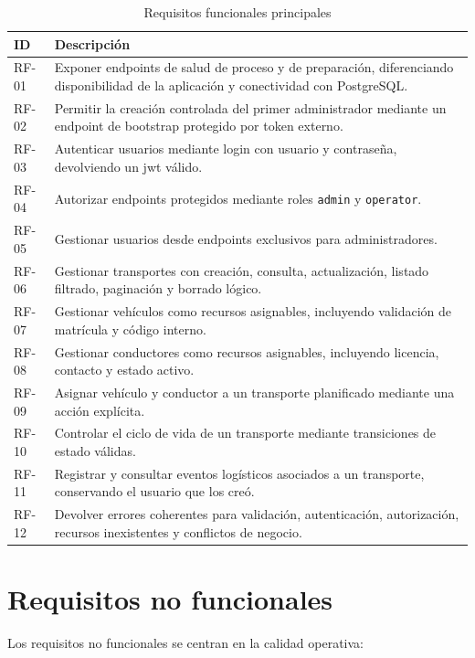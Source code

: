\begin{longtable}{@{}p{}p{}@{}}
\caption{Requisitos funcionales principales}
\label{tab:requisitos-funcionales}\\
\textbf{ID} & \textbf{Descripción} \\
\hline
RF-01 & Exponer endpoints de salud de proceso y de preparación, diferenciando disponibilidad de la aplicación y conectividad con PostgreSQL. \\
RF-02 & Permitir la creación controlada del primer administrador mediante un endpoint de bootstrap protegido por token externo. \\
RF-03 & Autenticar usuarios mediante login con usuario y contraseña, devolviendo un \acrshort{jwt} válido. \\
RF-04 & Autorizar endpoints protegidos mediante roles \texttt{admin} y \texttt{operator}. \\
RF-05 & Gestionar usuarios desde endpoints exclusivos para administradores. \\
RF-06 & Gestionar transportes con creación, consulta, actualización, listado filtrado, paginación y borrado lógico. \\
RF-07 & Gestionar vehículos como recursos asignables, incluyendo validación de matrícula y código interno. \\
RF-08 & Gestionar conductores como recursos asignables, incluyendo licencia, contacto y estado activo. \\
RF-09 & Asignar vehículo y conductor a un transporte planificado mediante una acción explícita. \\
RF-10 & Controlar el ciclo de vida de un transporte mediante transiciones de estado válidas. \\
RF-11 & Registrar y consultar eventos logísticos asociados a un transporte, conservando el usuario que los creó. \\
RF-12 & Devolver errores coherentes para validación, autenticación, autorización, recursos inexistentes y conflictos de negocio. \\
\end{longtable}

\section{Requisitos no funcionales}
\label{sec:requisitos-no-funcionales}

Los requisitos no funcionales se centran en la calidad operativa:


